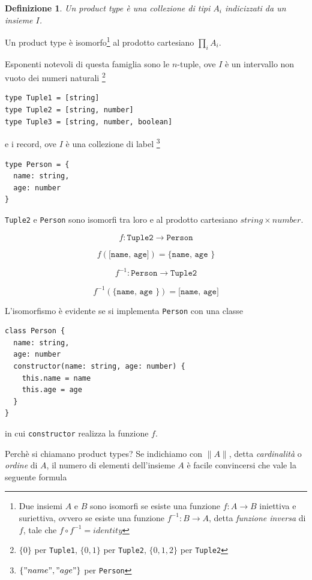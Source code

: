 \documentclass[12pt]{article}
\newtheorem{definition}{Definizione}
\begin{document}
\begin{definition}
Un product type è una collezione di tipi $A_i$ indicizzati da un insieme $I$.
\end{definition}

Un product type è isomorfo\footnote{Due insiemi $A$ e $B$ sono isomorfi se esiste una funzione $f: A \rightarrow B$ iniettiva e suriettiva,
ovvero se esiste una funzione $f^{-1}: B \rightarrow A$, detta \emph{funzione inversa} di $f$, tale che $f \circ f^{-1} = identity$}
al prodotto cartesiano $\prod_i A_i$.

Esponenti notevoli di questa famiglia sono le $n$-tuple, ove $I$ è un intervallo non vuoto dei numeri naturali
\footnote{$\{0\}$ per \texttt{Tuple1}, $\{0, 1\}$ per \texttt{Tuple2}, $\{0, 1, 2\}$ per \texttt{Tuple2}}

\begin{verbatim}
type Tuple1 = [string]
type Tuple2 = [string, number]
type Tuple3 = [string, number, boolean]
\end{verbatim}

e i record, ove $I$ è una collezione di label
\footnote{$\{ "name", "age" \}$ per \texttt{Person}}

\begin{verbatim}
type Person = {
  name: string,
  age: number
}
\end{verbatim}

\texttt{Tuple2} e \texttt{Person} sono isomorfi tra loro e al prodotto cartesiano $string \times number$.

$$
f: \texttt{Tuple2} \rightarrow \texttt{Person}
$$

$$
f(\texttt{[name, age]}) = \texttt{\{ name, age  \}}
$$

$$
f^{-1}: \texttt{Person} \rightarrow \texttt{Tuple2}
$$

$$
f^{-1}(\texttt{\{ name, age  \}}) = \texttt{[name, age]}
$$

L'isomorfismo è evidente se si implementa \texttt{Person} con una classe

\begin{verbatim}
class Person {
  name: string,
  age: number
  constructor(name: string, age: number) {
    this.name = name
    this.age = age
  }
}
\end{verbatim}

in cui \texttt{constructor} realizza la funzione $f$.

Perchè si chiamano product types? Se indichiamo con $\|A\|$, detta \emph{cardinalità} o \emph{ordine} di $A$, il numero di elementi
dell'insieme $A$ è facile convincersi che vale la seguente formula
\end{document}
